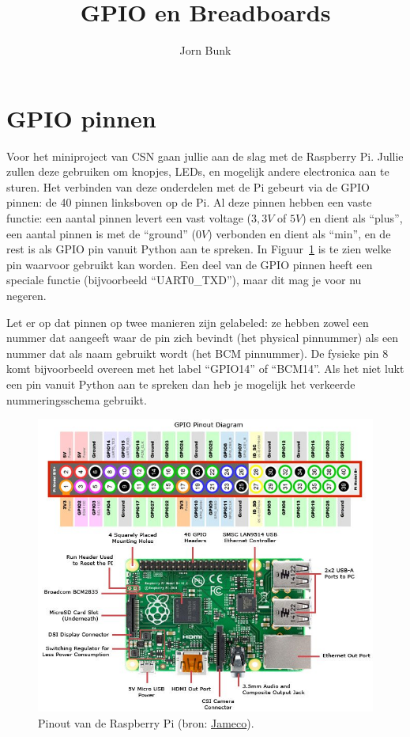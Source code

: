 \documentclass{guide}
\title{GPIO en Breadboards}
\author{Jorn Bunk}
\begin{document}
\section{GPIO pinnen}
Voor het miniproject van CSN gaan jullie aan de slag met de Raspberry Pi. Jullie zullen deze gebruiken om knopjes, LEDs, en mogelijk andere electronica aan te sturen. Het verbinden van deze onderdelen met de Pi gebeurt via de GPIO pinnen: de 40 pinnen linksboven op de Pi. Al deze pinnen hebben een vaste functie: een aantal pinnen levert een vast voltage ($3,3V$ of $5V$) en dient als \enquote{plus}, een aantal pinnen is met de \enquote{ground} ($0V$) verbonden en dient als \enquote{min}, en de rest is als GPIO pin vanuit Python aan te spreken. In Figuur~\ref{fig:pinout} is te zien welke pin waarvoor gebruikt kan worden. Een deel van de GPIO pinnen heeft een speciale functie (bijvoorbeeld \enquote{UART0\_TXD}), maar dit mag je voor nu negeren.

Let er op dat pinnen op twee manieren zijn gelabeled: ze hebben zowel een nummer dat aangeeft waar de pin zich bevindt (het physical pinnummer) als een nummer dat als naam gebruikt wordt (het BCM pinnummer). De fysieke pin 8 komt bijvoorbeeld overeen met het label \enquote{GPIO14} of \enquote{BCM14}. Als het niet lukt een pin vanuit Python aan te spreken dan heb je mogelijk het verkeerde nummeringsschema gebruikt.

\begin{figure}[h]
  \centering
  \includegraphics[width=\textwidth]{images/pinout.png}
  \caption{Pinout van de Raspberry Pi (bron: \href{https://www.jameco.com/Jameco/workshop/circuitnotes/raspberry-pi-circuit-note.html}{Jameco}).} \label{fig:pinout}
\end{figure}
\end{document}
